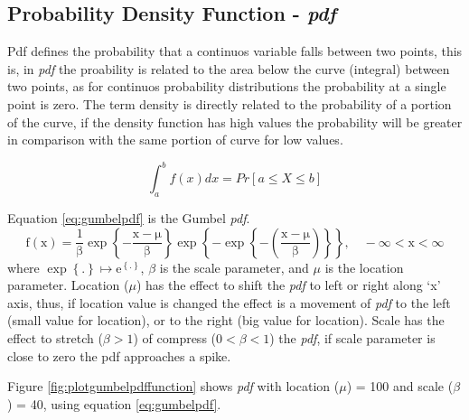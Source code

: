 \documentclass[12pt,twoside]{reedthesis}
\begin{document}
\hypertarget{probability-density-function---pdf}{%
\subsection{\texorpdfstring{Probability Density Function - \emph{pdf}}{Probability Density Function - pdf}}\label{probability-density-function---pdf}}

Pdf defines the probability that a continuos variable falls between two points, this is, in \emph{pdf} the proability is related to the area below the curve (integral) between two points, as for continuos probability distributions the probability at a single point is zero. The term density is directly related to the probability of a portion of the curve, if the density function has high values the probability will be greater in comparison with the same portion of curve for low values.

\[
\int_a^b f(x)dx = Pr[a \leq X \leq b]
\]

Equation \eqref{eq:gumbelpdf} is the Gumbel \emph{pdf}.
\begin{equation}
  \mathrm{
          f(x)=\frac{1}{\beta}
          \exp\left\{
            -\frac{x-\mu}{\beta}
          \right\}
          \exp\left\{
            -\exp\left\{
              -\left(
                \frac{x-\mu}{\beta}
              \right)
            \right\}
          \right\},
          \quad -\infty < x < \infty
         }
  \label{eq:gumbelpdf}
\end{equation}
where \(\exp\left\{.\right\} \mapsto \mathrm{e}^{\left\{.\right\}}\), \(\beta\) is the scale parameter, and \(\mu\) is the location parameter. Location (\(\mu\)) has the effect to shift the \emph{pdf} to left or right along `x' axis, thus, if location value is changed the effect is a movement of \emph{pdf} to the left (small value for location), or to the right (big value for location). Scale has the effect to stretch (\(\beta > 1\)) of compress (\(0 < \beta< 1\)) the \emph{pdf}, if scale parameter is close to zero the pdf approaches a spike.

Figure \ref{fig:plotgumbelpdffunction} shows \emph{pdf} with location (\(\mu\)) = 100 and scale (\(\beta\)) = 40, using equation \eqref{eq:gumbelpdf}.
\end{document}
